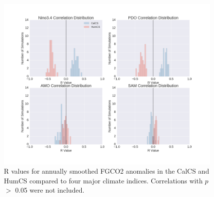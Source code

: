 \documentclass[12pt]{article}
\begin{document}
\begin{figure}[!h]
	\centering
	\includegraphics[width=\linewidth]{../../figs/pacific/pacific-EBU-correlation-distributions.png}
	\caption{R values for annually smoothed FGCO2 anomalies in the CalCS and HumCS compared to four major climate indices. Correlations with $p$ $>$ 0.05 were not included.}
	\label{fig:pacific-histograms}
\end{figure}
\end{document}
